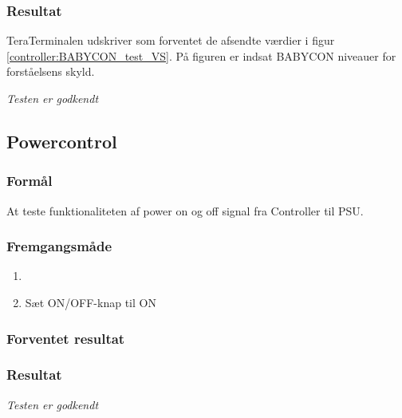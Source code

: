 \subsubsection*{Resultat} 
TeraTerminalen udskriver som forventet de afsendte værdier i figur \ref{controller:BABYCON_test_VS}. På figuren er indsat BABYCON niveauer for forståelsens skyld.


\textit{Testen er godkendt}

\subsection*{Powercontrol}

\subsubsection*{Formål}
At teste funktionaliteten af power on og off signal fra Controller til PSU.

\subsubsection*{Fremgangsmåde}
\begin{enumerate}
\item 
\item Sæt ON/OFF-knap til ON
\

\end{enumerate}

\subsubsection*{Forventet resultat} 


\subsubsection*{Resultat} 

\textit{Testen er godkendt}
